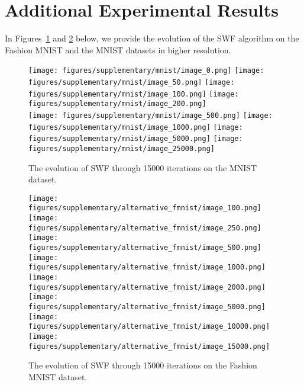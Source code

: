 


\section{Additional Experimental Results}

In Figures~\ref{fig:suppmnist} and \ref{fig:suppfmnist} below, we provide the evolution of the SWF algorithm on the Fashion MNIST and the MNIST datasets in higher resolution.


\begin{figure}
\centering
\texttt{[image: figures/supplementary/mnist/image\_0.png]}
\texttt{[image: figures/supplementary/mnist/image\_50.png]}
\texttt{[image: figures/supplementary/mnist/image\_100.png]}
\texttt{[image: figures/supplementary/mnist/image\_200.png]}\\
\texttt{[image: figures/supplementary/mnist/image\_500.png]}
\texttt{[image: figures/supplementary/mnist/image\_1000.png]}
\texttt{[image: figures/supplementary/mnist/image\_5000.png]}
\texttt{[image: figures/supplementary/mnist/image\_25000.png]}
\caption{The evolution of SWF through 15000 iterations on the MNIST dataset.}
\label{fig:suppmnist}
\end{figure}

\begin{figure}
\centering
\texttt{[image: figures/supplementary/alternative\_fmnist/image\_100.png]}
\texttt{[image: figures/supplementary/alternative\_fmnist/image\_250.png]}
\texttt{[image: figures/supplementary/alternative\_fmnist/image\_500.png]}
\texttt{[image: figures/supplementary/alternative\_fmnist/image\_1000.png]}\\
\texttt{[image: figures/supplementary/alternative\_fmnist/image\_2000.png]}
\texttt{[image: figures/supplementary/alternative\_fmnist/image\_5000.png]}
\texttt{[image: figures/supplementary/alternative\_fmnist/image\_10000.png]}
\texttt{[image: figures/supplementary/alternative\_fmnist/image\_15000.png]}
\caption{The evolution of SWF through 15000 iterations on the Fashion MNIST dataset.}
\label{fig:suppfmnist}
\end{figure}







